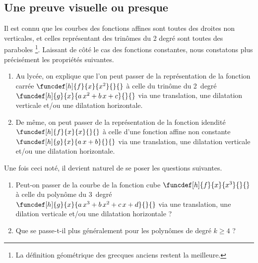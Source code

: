\subsection{Une preuve visuelle ou presque}

\leavevmode
\smallskip




Il est connu que les courbes des fonctions affines sont toutes des droites non verticales, et celles représentant des trinômes du 2\ieme{} degré sont toutes des paraboles
\footnote{
	La définition géométrique des grecques anciens restent la meilleure.
}.
Laissant de côté le cas des fonctions constantes, nous constatons plus précisément les propriétés suivantes.
%
\begin{enumerate}
	\item Au lycée, on explique que l'on peut passer de la représentation de la fonction carrée 
	$\funcdef[h]{f}{x}{x^2}{}{}$ 
	à celle du trinôme du 2\ieme\ degré
	$\funcdef[h]{g}{x}{a \, x^2 + b \, x + c}{}{}$
	via une translation, une dilatation verticale et/ou une dilatation horizontale.


	\item De même, on peut passer de la représentation de la fonction idendité
	$\funcdef[h]{f}{x}{x}{}{}$ 
	à celle d'une fonction affine non constante
	$\funcdef[h]{g}{x}{a \, x + b}{}{}$
	via une translation, une dilatation verticale et/ou une dilatation horizontale.
\end{enumerate}

Une fois ceci noté, il devient naturel de se poser les questions suivantes.
%
\begin{enumerate}	
	\item Peut-on passer de la courbe de la fonction cube
	      $\funcdef[h]{f}{x}{x^3}{}{}$
		  à celle du polynôme du 3\ieme\ degré
		  $\funcdef[h]{g}{x}{a \, x^3 + b \, x^2 + c \, x + d}{}{}$
		  via une translation, une dilation verticale et/ou une dilatation horizontale ?

	\item Que se passe-t-il plus généralement pour les polynômes de degré  $k \geq 4$ ?
\end{enumerate}

 